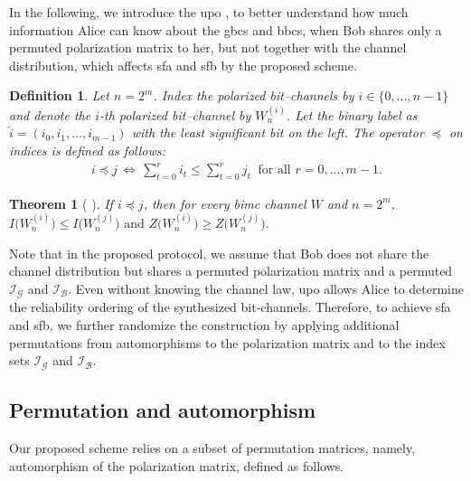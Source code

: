 \documentclass[onecolumn]{IEEEtran} %
\newcommand{\1}{\mathbbm{1}}
\theoremstyle{boldremark}
\newtheorem{thm}{Theorem}
\newtheorem{definition}{Definition}
\begin{document}
In the following, we introduce the \gls{upo} \cite{UPO_Schurch_ISIT16,UPO_He_GC17}, to better understand how much information Alice can know about the \gls{gbcs} and \gls{bbcs}, when Bob shares only a permuted polarization matrix to her, but not together with the channel distribution, which affects \gls{sfa} and \gls{sfb} by the proposed scheme.

\begin{definition}
Let $n=2^m$. Index the polarized bit–channels by $i\in\{0,\dots,n-1\}$ and denote the $i$-th polarized bit–channel by $W_{n}^{(i)}$.
Let the binary label as $\widehat{i}=(i_0,i_1,\dots,i_{m-1})$ with the \emph{least significant bit on the left}. The operator $\preceq$ on indices is defined as follows:
\begin{align}\label{EQ_UPO_marjorization}
i \preceq j
\,\Longleftrightarrow\,
\sum_{t=0}^{r} i_t \le \sum_{t=0}^{r} j_t \;\; \text{for all } r=0,\dots,m-1.    
\end{align}
\end{definition}


\begin{thm}[ \cite{UPO_Schurch_ISIT16}]
If $i \preceq j$, then for every \gls{bimc} channel $W$ and $n=2^m$, $I\!\big(W_{n}^{(i)}\big) \le I\!\big(W_{n}^{(j)}\big)
\text{ and }
Z\!\big(W_{n}^{(i)}\big) \ge Z\!\big(W_{n}^{(j)}\big).$
\end{thm}

Note that in the proposed protocol, we assume that Bob does not share the channel distribution but shares a permuted polarization matrix and a permuted $\mathcal{I}_{\mathcal G}$ and $\mathcal{I}_{\mathcal B}$. Even without knowing the channel law, \gls{upo} allows Alice to determine the reliability ordering of the synthesized bit-channels. Therefore, to achieve \gls{sfa} and \gls{sfb}, we further randomize the construction by applying additional permutations from automorphisms to the polarization matrix and to the index sets $\mathcal{I}_{\mathcal G}$ and $\mathcal{I}_{\mathcal B}$.

\subsection{Permutation and automorphism}\label{Sec_Permute_Aut}
Our proposed scheme relies on a subset of permutation matrices, namely, automorphism of the polarization matrix, defined as follows.
\end{document}
